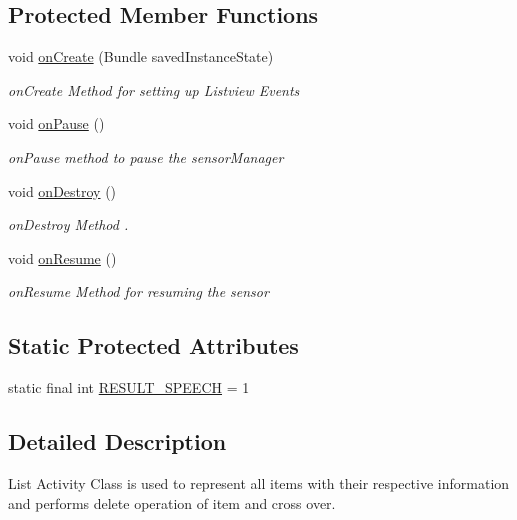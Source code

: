 \subsection*{Protected Member Functions}
\begin{DoxyCompactItemize}
\item 
void \hyperlink{classcom_1_1example_1_1santh_1_1shoppinglist_1_1_list_activity_affe7979f09447f88b742e0a27f2469a2}{on\+Create} (Bundle saved\+Instance\+State)
\begin{DoxyCompactList}\small\item\em on\+Create Method for setting up Listview Events \end{DoxyCompactList}\item 
void \hyperlink{classcom_1_1example_1_1santh_1_1shoppinglist_1_1_list_activity_a656f84d86a0cf1302ac1961f241fcefe}{on\+Pause} ()
\begin{DoxyCompactList}\small\item\em on\+Pause method to pause the sensor\+Manager \end{DoxyCompactList}\item 
void \hyperlink{classcom_1_1example_1_1santh_1_1shoppinglist_1_1_list_activity_a03da83dbc50946c4de153f3f8ccb20d5}{on\+Destroy} ()
\begin{DoxyCompactList}\small\item\em on\+Destroy Method . \end{DoxyCompactList}\item 
void \hyperlink{classcom_1_1example_1_1santh_1_1shoppinglist_1_1_list_activity_a7d54b1d68cbd82fb0468b4401e0730bd}{on\+Resume} ()
\begin{DoxyCompactList}\small\item\em on\+Resume Method for resuming the sensor \end{DoxyCompactList}\end{DoxyCompactItemize}
\subsection*{Static Protected Attributes}
\begin{DoxyCompactItemize}
\item 
static final int \hyperlink{classcom_1_1example_1_1santh_1_1shoppinglist_1_1_list_activity_ae837f52436477b84e95460db4cc00cec}{R\+E\+S\+U\+L\+T\+\_\+\+S\+P\+E\+E\+CH} = 1
\end{DoxyCompactItemize}


\subsection{Detailed Description}
List Activity Class is used to represent all items with their respective information and performs delete operation of item and cross over. 

